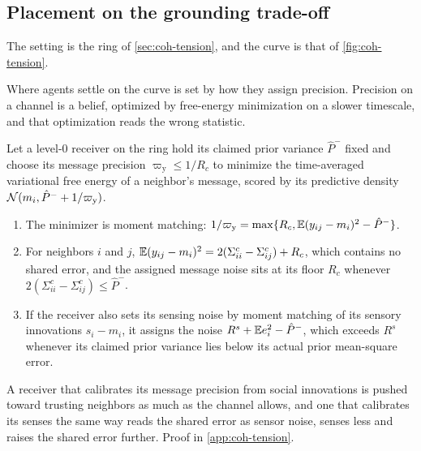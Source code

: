 \subsection{Placement on the grounding trade-off}\label{sup:coh-placement-on-the-grounding-trade-off}

The setting is the ring of \cref{sec:coh-tension}, and the curve is that of \cref{fig:coh-tension}.

Where agents settle on the curve is set by how they assign precision. Precision on a channel is a belief, optimized by free-energy minimization on a slower timescale, and that optimization reads the wrong statistic.

\begin{proposition}\label{prop:coh-placement}
Let a level-0 receiver on the ring hold its claimed prior variance $\hat P^-$ fixed and choose its message precision $\varpi_{\mathrm y}\le1/R_c$ to minimize the time-averaged variational free energy of a neighbor's message, scored by its predictive density $\mathcal{N}(m_i,\hat P^-+1/\varpi_{\mathrm y})$.
\begin{enumerate}\renewcommand{\labelenumi}{(\alph{enumi})}
\item The minimizer is moment matching: $1/\varpi_{\mathrm y}=\max\{R_c,\mathbb{E}(y_{ij}-m_i)^2-\hat P^-\}$.
\item For neighbors $i$ and $j$, $\mathbb{E}(y_{ij}-m_i)^2=2(\Sigma^c_{ii}-\Sigma^c_{ij})+R_c$, which contains no shared error, and the assigned message noise sits at its floor $R_c$ whenever $2(\Sigma^c_{ii}-\Sigma^c_{ij})\le\hat P^-$.
\item If the receiver also sets its sensing noise by moment matching of its sensory innovations $s_i-m_i$, it assigns the noise $R^s+\mathbb{E} e_i^2-\hat P^-$, which exceeds $R^s$ whenever its claimed prior variance lies below its actual prior mean-square error.
\end{enumerate}
\end{proposition}

A receiver that calibrates its message precision from social innovations is pushed toward trusting neighbors as much as the channel allows, and one that calibrates its senses the same way reads the shared error as sensor noise, senses less and raises the shared error further. Proof in \cref{app:coh-tension}.

